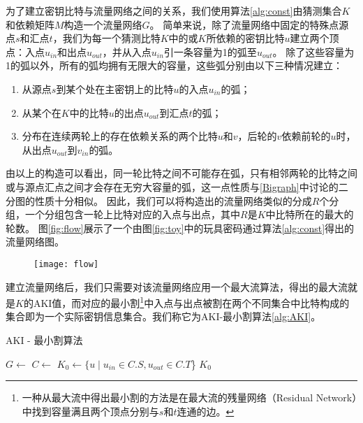 为了建立密钥比特与流量网络之间的关系，我们使用算法\ref{alg:const}由猜测集合$K$和依赖矩阵$M$构造一个流量网络$G$。
简单来说，除了流量网络中固定的特殊点源点$s$和汇点$t$，我们为每一个猜测比特$K$中的或$K$所依赖的密钥比特$u$建立两个顶点：入点$u_{in}$和出点$u_{out}$，并从入点$u_{in}$引一条容量为1的弧至$u_{out}$。
除了这些容量为1的弧以外，所有的弧均拥有无限大的容量，这些弧分别由以下三种情况建立：
\begin{enumerate}
    \item 从源点$s$到某个处在主密钥上的比特$u$的入点$u_{in}$的弧；
    \item 从某个在$K$中的比特$u$的出点$u_{out}$到汇点$t$的弧；
    \item 分布在连续两轮上的存在依赖关系的两个比特$u$和$v$，后轮的$v$依赖前轮的$u$时，从出点$u_{out}$到$v_{in}$的弧。
\end{enumerate}

由以上的构造可以看出，同一轮比特之间不可能存在弧，只有相邻两轮的比特之间或与源点汇点之间才会存在无穷大容量的弧，这一点性质与\ref{Bigraph}中讨论的二分图的性质十分相似。
因此，我们可以将构造出的流量网络类似的分成$R$个分组，一个分组包含一轮上比特对应的入点与出点，其中$R$是$K$中比特所在的最大的轮数。
图\ref{fig:flow}展示了一个由图\ref{fig:toy}中的玩具密码通过算法\ref{alg:const}得出的流量网络图。
\begin{figure}[htbp]
\centering
    \texttt{[image: flow]}
\end{figure}

建立流量网络后，我们只需要对该流量网络应用一个最大流算法，得出的最大流就是$K$的AKI值，而对应的最小割\footnote{一种从最大流中得出最小割的方法是在最大流的残量网络（Residual Network）中找到容量满且两个顶点分别与$s$和$t$连通的边。}中入点与出点被割在两个不同集合中比特构成的集合即为一个实际密钥信息集合。我们称它为AKI-最小割算法\ref{alg:AKI}。
\begin{algorithm}
    \caption{AKI - 最小割算法}
    \begin{algorithmic}[1]
            \State $G \gets$
            \State $C \gets$
            \State $K_0 \gets \{u\mid u_{in}\in C.S,u_{out}\in C.T$\}
            \State \Return $K_0$
        \EndFunction
    \end{algorithmic}
    \label{alg:AKI}
\end{algorithm}

